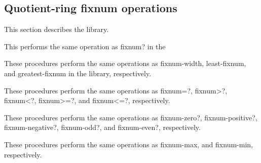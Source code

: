 \subsection{Quotient-ring fixnum operations}

This section describes the  library.

\begin{entry}{%
}

This performs the same operation as {\cf fixnum?} in the 
\end{entry}

\begin{entry}{%
}

These procedures perform the same operations as {\cf fixnum-width},
{\cf least-fixnum}, and {\cf greatest-fixnum} in the  library,
respectively.
\end{entry}

\begin{entry}{%
}

These procedures perform the same operations as {\cf fixnum=?}, {\cf
  fixnum>?}, {\cf fixnum<?}, {\cf fixnum>=?}, and {\cf fixnum<=?},
respectively.
\end{entry}

\begin{entry}{%
}

These procedures perform the same operations as {\cf fixnum-zero?},
{\cf fixnum-positive?}, {\cf fixnum-negative?}, {\cf fixnum-odd?}, and
{\cf fixnum-even?}, respectively.
\end{entry}

\begin{entry}{%
}

These procedures perform the same operations as {\cf fixnum-max},
and {\cf fixnum-min}, respectively.
\end{entry}

